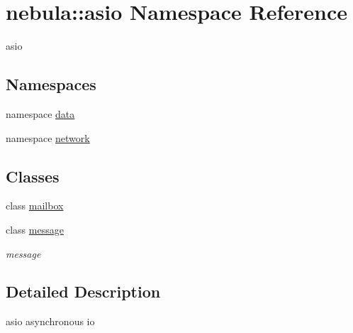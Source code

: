 \hypertarget{namespacenebula_1_1asio}{
\section{nebula::asio Namespace Reference}
\label{namespacenebula_1_1asio}
}


asio  
\subsection*{Namespaces}
\begin{DoxyCompactItemize}
\item 
namespace \hyperlink{namespacenebula_1_1asio_1_1data}{data}
\item 
namespace \hyperlink{namespacenebula_1_1asio_1_1network}{network}
\end{DoxyCompactItemize}
\subsection*{Classes}
\begin{DoxyCompactItemize}
\item 
class \hyperlink{classnebula_1_1asio_1_1mailbox}{mailbox}
\item 
class \hyperlink{classnebula_1_1asio_1_1message}{message}
\begin{DoxyCompactList}\small\item\em message \item\end{DoxyCompactList}\end{DoxyCompactItemize}


\subsection{Detailed Description}
asio asynchronous io 